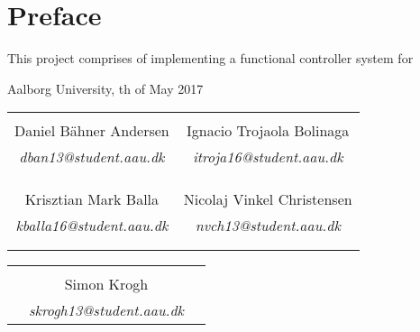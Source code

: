 \chapter*{Preface}

This project comprises of implementing a functional controller system for 

\hfill Aalborg University, th of May 2017




\vfill

\begin{table}[H]
	\centering
		\begin{tabular}{c c }
			\underline{\phantom{mmmmmmmmmmmmmmmmmmm}}       & \underline{\phantom{mmmmmmmmmmmmmmmmmmm}} \\
			Daniel Bähner Andersen			 & Ignacio Trojaola Bolinaga  \\
			\textit{dban13@student.aau.dk} & \textit{itroja16@student.aau.dk}\\
			&\\
			&\\
			\underline{\phantom{mmmmmmmmmmmmmmmmmmm}}       & \underline{\phantom{mmmmmmmmmmmmmmmmmmm}} \\
			Krisztian Mark Balla			 & Nicolaj Vinkel Christensen \\
			\textit{kballa16@student.aau.dk} & \textit{nvch13@student.aau.dk} \\
			&\\
			&\\	
		\end{tabular}
		\begin{tabular}{c c c}
			& \underline{\phantom{mmmmmmmmmmmmmmmmmmm}} 	& \\
			& Simon Krogh					& \\
			& \textit{skrogh13@student.aau.dk}		& \\
		\end{tabular}
\end{table}